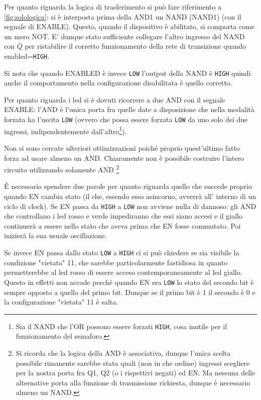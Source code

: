 \documentclass[a4paper,10pt]{article}
\def\code#1{\texttt{#1}}
\begin{document}
Per quanto riguarda la logica di trasferimento si può fare riferimento a \cref{fig:solologica}: si è interposta prima della AND1 un NAND (NAND1) (con il segnale di ENABLE). Questo, quando il dispositivo è abilitato, si comporta come un mero NOT. E' dunque stato sufficiente collegare l'altro ingresso del NAND con $\bar{Q}$ per ristabilire il corretto funzionamento della rete di transizione quando enabled=\code{HIGH}.

Si nota che quando ENABLED è invece \code{LOW} l'output della NAND è \code{HIGH} quindi anche il comportamento nella configurazione disabilitata è quello corretto.

Per quanto riguarda i led si è dovuti ricorrere a due AND con il segnale ENABLE: l'AND è l'unica porta fra quelle date a disposizione che nella modalità forzata ha l'uscita \code{LOW} (ovvero che possa essere forzata \code{LOW} da uno solo dei due ingressi, indipendentemente dall'altro\footnote{Sia il NAND che l'OR possono essere forzati \code{HIGH}, cosa inutile per il funzionamento del semaforo.}).

Non si sono cercate ulteriori ottimizzazioni poiché proprio quest'ultimo fatto forza ad usare almeno un AND. Chiaramente non è possibile costruire l'intero circuito utilizzando solamente AND \footnote{Si ricorda che la logica della AND è associativa, dunque l'unica scelta possibile rimanente sarebbe stata quali (non in che ordine) ingressi scegliere per la nostra porta fra Q1, Q2 (o i rispettivi negati) ed EN. Ma nessuna delle alternative porta alla funzione di trasmissione richiesta, dunque è necessario almeno un NAND.} 

\'E necessario spendere due parole per quanto riguarda quello che succede proprio quando EN cambia stato (il che, essendo esso asincorno, avverrà all' interno di un ciclo di clock). Se EN passa da \code{HIGH} a \code{LOW} non avviene nulla di dannoso: gli AND che controllano i led rosso e verde impediranno che essi siano accesi e il giallo continuerà a essere nello stato che aveva prima che EN fosse commutato. Poi inizierà la sua usuale oscillazione.

Se invece  EN passa dallo stato \code{LOW} a \code{HIGH} ci si può chiedere se sia visibile la condizione "vietata" 11, che sarebbe particolarmente fastidiosa in quanto permetterebbe al led rosso di essere acceso contemporaneamente al led giallo. Questo in effetti non accade perché quando EN era \code{LOW} lo stato del secondo bit è sempre opposto a quello del primo bit. Dunque se il primo bit è 1 il secondo è 0 e la configurazione "vietata" 11 è salta.
\end{document}
